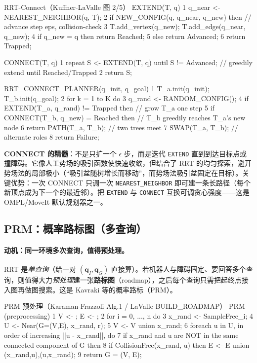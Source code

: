 \begin{codebox}[text]{RRT-Connect（Kuffner-LaValle 图 2/5）}
EXTEND(T, q)
 1  q_near <- NEAREST_NEIGHBOR(q, T);
 2  if NEW_CONFIG(q, q_near, q_new) then    // advance step eps, collision-check
 3      T.add_vertex(q_new); T.add_edge(q_near, q_new);
 4      if q_new = q then return Reached;
 5      else return Advanced;
 6  return Trapped;

CONNECT(T, q)
 1  repeat S <- EXTEND(T, q) until S != Advanced;   // greedily extend until Reached/Trapped
 2  return S;

RRT_CONNECT_PLANNER(q_init, q_goal)
 1  T_a.init(q_init);  T_b.init(q_goal);
 2  for k = 1 to K do
 3      q_rand <- RANDOM_CONFIG();
 4      if EXTEND(T_a, q_rand) != Trapped then        // grow T_a one step
 5          if CONNECT(T_b, q_new) = Reached then       // T_b greedily reaches T_a's new node
 6              return PATH(T_a, T_b);                   // two trees meet
 7      SWAP(T_a, T_b);                                  // alternate roles
 8  return Failure;
\end{codebox}

\noindent\textbf{CONNECT 的精髓}：不是只扩一个 $\epsilon$ 步，而是迭代 \texttt{EXTEND} 直到到达目标点或撞障碍。它像人工势场的吸引函数使快速收敛，但结合了 RRT 的均匀探索，避开势场法的局部极小（“吸引盆随树增长而移动”，而势场法吸引盆固定在目标）。关键优势：一次 CONNECT 只调一次 \texttt{NEAREST\_NEIGHBOR} 即可建一条长路径（每个新顶点成为下一个的最近邻）。把 \texttt{EXTEND} 与 \texttt{CONNECT} 互换可调贪心强度——这是 OMPL/MoveIt 默认规划器之一。

\subsection{PRM：概率路标图（多查询）}
\label{sec:plan-prm}

\paragraph{动机：同一环境多次查询，值得预处理。}
RRT 是\emph{单查询}（给一对 $(\mathbf{q}_I,\mathbf{q}_G)$ 直接算）。若机器人与障碍固定、要回答多个查询，则值得大力\emph{预处理}建一张\textbf{路标图}（roadmap），之后每个查询只需把起终点接入图再做图搜索。这是 Kavraki 等的概率路标（PRM）。

\begin{codebox}[text]{PRM 预处理（Karaman-Frazzoli Alg.1 / LaValle BUILD\_ROADMAP）}
PRM (preprocessing)
 1  V <- {};  E <- {};
 2  for i = 0, ..., n do
 3      x_rand <- SampleFree_i;
 4      U <- Near(G=(V,E), x_rand, r);
 5      V <- V union {x_rand};
 6      foreach u in U, in order of increasing ||u - x_rand||, do
 7          if x_rand and u are NOT in the same connected component of G then
 8              if CollisionFree(x_rand, u) then E <- E union {(x_rand,u),(u,x_rand)};
 9  return G = (V, E);
\end{codebox}

